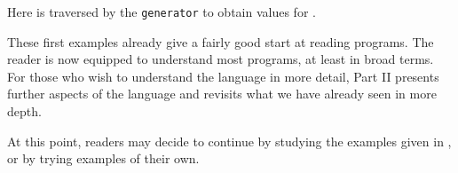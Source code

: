 \begin{enumerate}
Here  is traversed by the \verb"generator" to obtain
values for .


\end{enumerate}

\clearpage

These first examples already give a fairly good start at reading
\asharp{} programs.  The reader is now equipped to understand
most \asharp{} programs, at least in broad terms.
For those who wish to understand the language in more detail,
Part II presents further aspects of the language and
revisits what we have already seen in more depth.

At this point, readers may decide to continue by studying the examples
given in , or by trying examples of their own.
